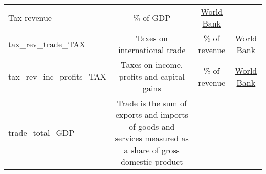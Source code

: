 \documentclass[]{article}
\begin{document}
\begin{longtable}[]{@{}lccc@{}}
\begin{minipage}[t]{0.36\columnwidth}
Tax revenue\strut
\end{minipage} & \begin{minipage}[t]{0.24\columnwidth}\centering\strut
\% of GDP\strut
\end{minipage} & \begin{minipage}[t]{0.15\columnwidth}\centering\strut
\href{https://data.worldbank.org/indicator/GC.TAX.TOTL.GD.ZS}{World
Bank}\strut
\end{minipage}\tabularnewline
\begin{minipage}[t]{0.14\columnwidth}\raggedright\strut
tax\_rev\_trade\_TAX\strut
\end{minipage} & \begin{minipage}[t]{0.36\columnwidth}\centering\strut
Taxes on international trade\strut
\end{minipage} & \begin{minipage}[t]{0.24\columnwidth}\centering\strut
\% of revenue\strut
\end{minipage} & \begin{minipage}[t]{0.15\columnwidth}\centering\strut
\href{https://data.worldbank.org/indicator/GC.TAX.INTT.RV.ZS}{World
Bank}\strut
\end{minipage}\tabularnewline
\begin{minipage}[t]{0.14\columnwidth}\raggedright\strut
tax\_rev\_inc\_profits\_TAX\strut
\end{minipage} & \begin{minipage}[t]{0.36\columnwidth}\centering\strut
Taxes on income, profits and capital gains\strut
\end{minipage} & \begin{minipage}[t]{0.24\columnwidth}\centering\strut
\% of revenue\strut
\end{minipage} & \begin{minipage}[t]{0.15\columnwidth}\centering\strut
\href{https://data.worldbank.org/indicator/GC.TAX.YPKG.RV.ZS}{World
Bank}\strut
\end{minipage}\tabularnewline
\begin{minipage}[t]{0.14\columnwidth}\raggedright\strut
trade\_total\_GDP\strut
\end{minipage} & \begin{minipage}[t]{0.36\columnwidth}\centering\strut
Trade is the sum of exports and imports of goods and services measured
as a share of gross domestic product\strut
\end{minipage} & \begin{minipage}[t]{0.24\columnwidth}\centering\strut

\end{minipage}
\end{longtable}
\end{document}
